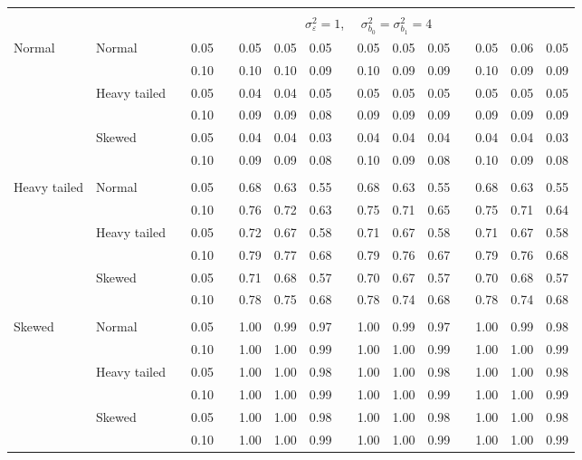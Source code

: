 \begin{table}[ht]
\begin{scriptsize}
\begin{center}
\begin{tabular}{ll p{.1cm} c p{.1cm} rrr p{.1cm} rrr p{.1cm} rrr}
&&&&&&&&&&&&&&&\\
& && && \multicolumn{9}{c}{$\sigma_{\varepsilon}^2 = 1$, \ \ $\sigma_{b_0}^2 = \sigma_{b_1}^2 = 4$} \\ \cline{6-16}

\rowcolor{gray!20}Normal       & Normal       && 0.05 &&   0.05 & 0.05 & 0.05 && 0.05 & 0.05 & 0.05 && 0.05 & 0.06 & 0.05 \\ 
\rowcolor{gray!20}             &              && 0.10 &&   0.10 & 0.10 & 0.09 && 0.10 & 0.09 & 0.09 && 0.10 & 0.09 & 0.09 \\ 
\rowcolor{gray!20}             & Heavy tailed && 0.05 &&   0.04 & 0.04 & 0.05 && 0.05 & 0.05 & 0.05 && 0.05 & 0.05 & 0.05 \\ 
\rowcolor{gray!20}             &              && 0.10 &&   0.09 & 0.09 & 0.08 && 0.09 & 0.09 & 0.09 && 0.09 & 0.09 & 0.09 \\ 
\rowcolor{gray!20}             & Skewed       && 0.05 &&   0.04 & 0.04 & 0.03 && 0.04 & 0.04 & 0.04 && 0.04 & 0.04 & 0.03 \\ 
\rowcolor{gray!20}             &              && 0.10 &&   0.09 & 0.09 & 0.08 && 0.10 & 0.09 & 0.08 && 0.10 & 0.09 & 0.08 \\ 
             &&&&&&&&&&&&&&&\\
Heavy tailed & Normal       && 0.05 &&   0.68 & 0.63 & 0.55 && 0.68 & 0.63 & 0.55 && 0.68 & 0.63 & 0.55 \\ 
             &              && 0.10 &&   0.76 & 0.72 & 0.63 && 0.75 & 0.71 & 0.65 && 0.75 & 0.71 & 0.64 \\ 
             & Heavy tailed && 0.05 &&   0.72 & 0.67 & 0.58 && 0.71 & 0.67 & 0.58 && 0.71 & 0.67 & 0.58 \\ 
             &              && 0.10 &&   0.79 & 0.77 & 0.68 && 0.79 & 0.76 & 0.67 && 0.79 & 0.76 & 0.68 \\ 
             & Skewed       && 0.05 &&   0.71 & 0.68 & 0.57 && 0.70 & 0.67 & 0.57 && 0.70 & 0.68 & 0.57 \\ 
             &              && 0.10 &&   0.78 & 0.75 & 0.68 && 0.78 & 0.74 & 0.68 && 0.78 & 0.74 & 0.68 \\ 
             &&&&&&&&&&&&&&&\\
Skewed       & Normal       && 0.05 &&   1.00 & 0.99 & 0.97 && 1.00 & 0.99 & 0.97 && 1.00 & 0.99 & 0.98 \\ 
             &              && 0.10 &&   1.00 & 1.00 & 0.99 && 1.00 & 1.00 & 0.99 && 1.00 & 1.00 & 0.99 \\ 
             & Heavy tailed && 0.05 &&   1.00 & 1.00 & 0.98 && 1.00 & 1.00 & 0.98 && 1.00 & 1.00 & 0.98 \\ 
             &              && 0.10 &&   1.00 & 1.00 & 0.99 && 1.00 & 1.00 & 0.99 && 1.00 & 1.00 & 0.99 \\ 
             & Skewed       && 0.05 &&   1.00 & 1.00 & 0.98 && 1.00 & 1.00 & 0.98 && 1.00 & 1.00 & 0.98 \\ 
             &              && 0.10 &&   1.00 & 1.00 & 0.99 && 1.00 & 1.00 & 0.99 && 1.00 & 1.00 & 0.99 \\ 



\end{tabular}
\end{center}
\end{scriptsize}
\end{table}
